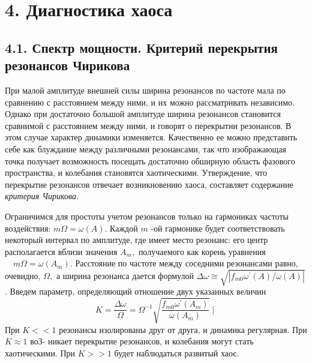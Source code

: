 \documentclass[11pt]{article}
\begin{document}
    \hypertarget{ux434ux438ux430ux433ux43dux43eux441ux442ux438ux43aux430-ux445ux430ux43eux441ux430}{%
\section{4. Диагностика
хаоса}\label{ux434ux438ux430ux433ux43dux43eux441ux442ux438ux43aux430-ux445ux430ux43eux441ux430}}

\hypertarget{ux441ux43fux435ux43aux442ux440-ux43cux43eux449ux43dux43eux441ux442ux438.-ux43aux440ux438ux442ux435ux440ux438ux439-ux43fux435ux440ux435ux43aux440ux44bux442ux438ux44f-ux440ux435ux437ux43eux43dux430ux43dux441ux43eux432-ux447ux438ux440ux438ux43aux43eux432ux430}{%
\subsection{4.1. Спектр мощности. Критерий перекрытия резонансов
Чирикова}\label{ux441ux43fux435ux43aux442ux440-ux43cux43eux449ux43dux43eux441ux442ux438.-ux43aux440ux438ux442ux435ux440ux438ux439-ux43fux435ux440ux435ux43aux440ux44bux442ux438ux44f-ux440ux435ux437ux43eux43dux430ux43dux441ux43eux432-ux447ux438ux440ux438ux43aux43eux432ux430}}

При малой амплитуде внешней силы ширина резонансов по частоте мала по
сравнению с расстоянием между ними, и их можно рассматривать независимо.
Однако при достаточно большой амплитуде ширина резонансов становится
сравнимой с расстоянием между ними, и говорят о перекрытии резонансов. В
этом случае характер динамики изменяется. Качественно ее можно
представить себе как блуждание между различными резонансами, так что
изображающая точка получает возможность посещать достаточно обширную
область фазового пространства, и колебания становятся хаотическими.
Утверждение, что перекрытие резонансов отвечает возникновению хаоса,
составляет содержание \emph{критерия Чирикова.}

Ограничимся для простоты учетом резонансов только на гармониках частоты
воздействия: \(m \Omega=\omega(A) .\) Каждой \(m\) -ой гармонике будет
соответствовать некоторый интервал по амплитуде, где имеет место
резонанс: его центр располагается вблизи значения \(A_{m},\) получаемого
как корень уравнения \(\quad m \Omega=\omega\left(A_{m}\right) .\)
Расстояние по частоте между соседними резонансами равно, очевидно,
\(\Omega,\) а ширина резонанса дается формулой
\(\Delta \omega \cong \sqrt{\left|f_{m 0} \omega^{\prime}(A) / \omega(A)\right|}\).
Введем параметр, определяющий отношение двух указанных величин \[
K=\frac{\Delta \omega}{\Omega}=\Omega^{-1} \sqrt{\frac{f_{m 0} \omega^{\prime}\left(A_{m}\right)}{\omega\left(A_{m}\right)}} \mid
\] При \(K<<1\) резонансы изолированы друг от друга, и динамика
регулярная. При \(K \approx 1\) воЗ- никает перекрытие резонансов, и
колебания могут стать хаотическими. При \(K>>1\) будет наблюдаться
развитый хаос.
\end{document}
